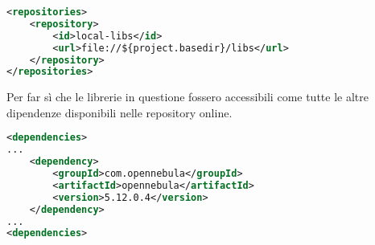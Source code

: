 \begin{lstlisting}[language=XML, caption=Repository locale, label=code:libsxml]
<repositories>
    <repository>
        <id>local-libs</id>
        <url>file://${project.basedir}/libs</url>
    </repository>
</repositories>
\end{lstlisting}
Per far sì che le librerie in questione fossero accessibili come tutte le altre dipendenze disponibili nelle repository online.
\begin{lstlisting}[language=XML, caption=Dipendenza di OpenNebula, label=code:dependencyOpenNebula]
<dependencies>
...
    <dependency>
        <groupId>com.opennebula</groupId>
        <artifactId>opennebula</artifactId>
        <version>5.12.0.4</version>
    </dependency>
...
<dependencies>
\end{lstlisting}

